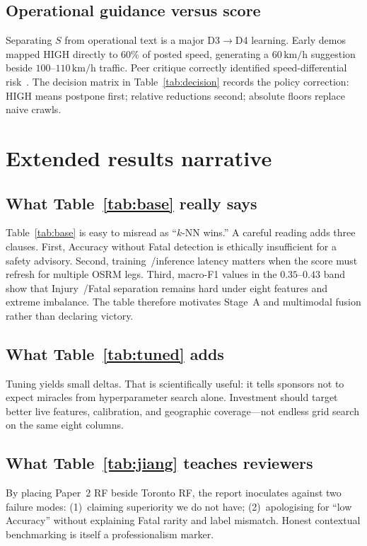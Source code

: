 \documentclass[11pt,a4paper]{article}
\begin{document}
\subsection{Operational guidance versus score}
Separating $S$ from operational text is a major D3$\rightarrow$D4 learning. Early demos mapped HIGH directly to $60\%$ of posted speed, generating a $60\,\mathrm{km/h}$ suggestion beside $100$--$110\,\mathrm{km/h}$ traffic. Peer critique correctly identified speed-differential risk~\citep{ahmad2022speed}. The decision matrix in Table~\ref{tab:decision} records the policy correction: HIGH means postpone first; relative reductions second; absolute floors replace naive crawls.

\newpage
\section*{Extended results narrative}
\label{sec:resext}

\subsection{What Table~\ref{tab:base} really says}
Table~\ref{tab:base} is easy to misread as ``$k$-NN wins.'' A careful reading adds three clauses. First, Accuracy without Fatal detection is ethically insufficient for a safety advisory. Second, training~/inference latency matters when the score must refresh for multiple OSRM legs. Third, macro-F1 values in the $0.35$--$0.43$ band show that Injury~/Fatal separation remains hard under eight features and extreme imbalance. The table therefore motivates Stage~A and multimodal fusion rather than declaring victory.

\subsection{What Table~\ref{tab:tuned} adds}
Tuning yields small deltas. That is scientifically useful: it tells sponsors not to expect miracles from hyperparameter search alone. Investment should target better live features, calibration, and geographic coverage---not endless grid search on the same eight columns.

\subsection{What Table~\ref{tab:jiang} teaches reviewers}
By placing Paper~2 RF beside Toronto RF, the report inoculates against two failure modes: (1)~claiming superiority we do not have; (2)~apologising for ``low Accuracy'' without explaining Fatal rarity and label mismatch. Honest contextual benchmarking is itself a professionalism marker.
\end{document}
